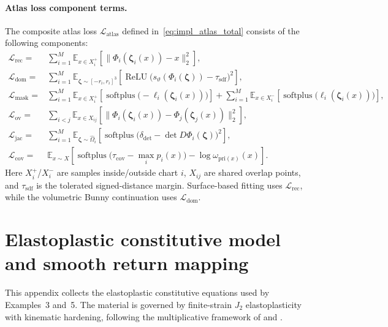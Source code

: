\documentclass[sort&compress]{svjour3} %
\begin{document}
\paragraph{Atlas loss component terms.}
The composite atlas loss $\mathcal{L}_{\mathrm{atlas}}$ defined in~\eqref{eq:impl_atlas_total} consists of the following components:
\begin{align}
\mathcal{L}_{\mathrm{rec}}
=&
\sum_{i=1}^{M}
\mathbb{E}_{x\in X_i^{+}}
\left[
\|\Phi_i(\boldsymbol{\zeta}_i(x))-x\|_2^2
\right],
\label{eq:impl_atlas_recon}\\
\mathcal{L}_{\mathrm{dom}}
=&
\sum_{i=1}^{M}
\mathbb{E}_{\boldsymbol{\zeta}\sim [-r_i,r_i]^3}
\left[
\operatorname{ReLU}\!\big(s_{\vartheta}(\Phi_i(\boldsymbol{\zeta}))-\tau_{\mathrm{sdf}}\big)^2
\right],
\label{eq:impl_atlas_domain}\\
\mathcal{L}_{\mathrm{mask}}
=&
\sum_{i=1}^{M}
\mathbb{E}_{x\in X_i^{+}}
\left[
\operatorname{softplus}\!\big(-\ell_i(\boldsymbol{\zeta}_i(x))\big)
\right]
+
\sum_{i=1}^{M}
\mathbb{E}_{x\in X_i^{-}}
\left[
\operatorname{softplus}\!\big(\ell_i(\boldsymbol{\zeta}_i(x))\big)
\right],
\label{eq:impl_atlas_mask}\\
\mathcal{L}_{\mathrm{ov}}
=&
\sum_{i<j}
\mathbb{E}_{x\in X_{ij}}
\left[
\|\Phi_i(\boldsymbol{\zeta}_i(x))-\Phi_j(\boldsymbol{\zeta}_j(x))\|_2^2
\right],
\label{eq:impl_atlas_overlap}\\
\mathcal{L}_{\mathrm{jac}}
=&
\sum_{i=1}^{M}
\mathbb{E}_{\boldsymbol{\zeta}\sim \widehat{\Omega}_i}
\left[
\operatorname{softplus}\!\big(\delta_{\det}-\det D\Phi_i(\boldsymbol{\zeta})\big)^2
\right],
\label{eq:impl_atlas_jac}\\
\mathcal{L}_{\mathrm{cov}}
=&
\mathbb{E}_{x\sim X}
\left[
\operatorname{softplus}\!\big(\tau_{\mathrm{cov}}-\max_i p_i(x)\big)
-\log \omega_{\mathrm{pri}(x)}(x)
\right].
\label{eq:impl_atlas_cov}
\end{align}
Here $X_i^{+}$/$X_i^{-}$ are samples inside/outside chart $i$, $X_{ij}$ are shared overlap points, and $\tau_{\mathrm{sdf}}$ is the tolerated signed-distance margin. Surface-based fitting uses $\mathcal{L}_{\mathrm{rec}}$, while the volumetric Bunny continuation uses $\mathcal{L}_{\mathrm{dom}}$.

\section{Elastoplastic constitutive model and smooth return mapping}
\label{sec:appendix_constitutive}

This appendix collects the elastoplastic constitutive equations used by Examples~3 and~5. The material is governed by finite-strain $J_2$ elastoplasticity with kinematic hardening, following the multiplicative framework of \citet{simo_computational_1998} and \citet{de_souza_neto_computational_2011}.
\end{document}
